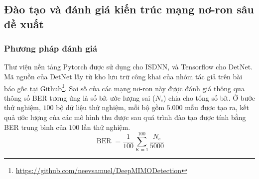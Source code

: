 \subsection{Đào tạo và đánh giá kiến trúc mạng nơ-ron sâu đề xuất}

\subsubsection*{\textbf{Phương pháp đánh giá}}

Thư viện nền tảng Pytorch được sử dụng cho ISDNN, và Tensorflow cho DetNet. Mã nguồn của DetNet lấy từ kho lưu trữ công khai của nhóm tác giả trên bài báo gốc tại Github\footnote{\url{https://github.com/neevsamuel/DeepMIMODetection}}. Sai số của các mạng nơ-ron này được đánh giá thông qua thông số BER tương ứng là số bít ước lượng sai ($N_e$) chia cho tổng số bít. Ở bước thử nghiệm, $100$ bộ dữ liệu thử nghiệm, mỗi bộ gồm $5.000$ mẫu được tạo ra, kết quả ước lượng của các mô hình thu được sau quá trình đào tạo được tính bằng BER trung bình của $100$ lần thử nghiệm.
\begin{equation}
    \operatorname{BER} = \frac{1}{100} \sum_{K=1}^{100} \frac{N_e}{5000}
\end{equation}

